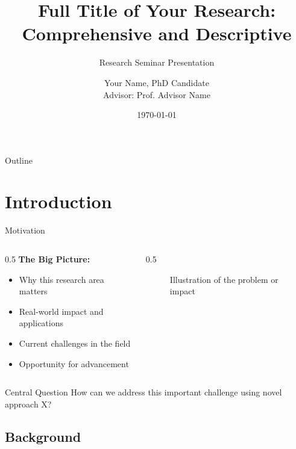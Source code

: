 \documentclass[aspectratio=169,11pt]{beamer}
\title[Short Title for Footer]{Full Title of Your Research:\\Comprehensive and Descriptive}
\subtitle{Research Seminar Presentation}
\author[Your Name]{Your Name, PhD Candidate\\
  Advisor: Prof. Advisor Name}
\institute[University]{
  Department of Your Field\\
  University Name\\
  \vspace{0.2cm}
  \texttt{yourname@university.edu}
}
\date{\today}
\begin{document}
\begin{frame}[plain]
  \titlepage
\end{frame}

\begin{frame}{Outline}
  \tableofcontents
\end{frame}


\section{Introduction}

\begin{frame}{Motivation}
  \begin{columns}[T]

    \begin{column}{0.5\textwidth}
      \textbf{The Big Picture:}
      \begin{itemize}
        \item Why this research area matters
        \item Real-world impact and applications
        \item Current challenges in the field
        \item Opportunity for advancement
      \end{itemize}
    \end{column}

    \begin{column}{0.5\textwidth}
      \begin{figure}
        \centering
        \caption{Illustration of the problem or impact}
      \end{figure}
    \end{column}

  \end{columns}

  \vspace{0.5cm}

  \begin{block}{Central Question}
    How can we address this important challenge using novel approach X?
  \end{block}
\end{frame}

\subsection{Background}
\end{document}
